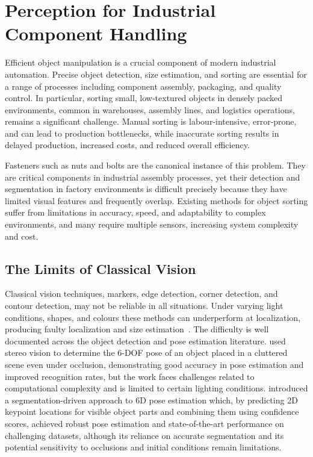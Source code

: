 \section{Perception for Industrial Component Handling}\label{sec:intro_perception}

Efficient object manipulation is a crucial component of modern industrial automation. Precise
object detection, size estimation, and sorting are essential for a range of processes including
component assembly, packaging, and quality control. In particular, sorting small, low-textured
objects in densely packed environments, common in warehouses, assembly lines, and logistics
operations, remains a significant challenge. Manual sorting is labour-intensive, error-prone,
and can lead to production bottlenecks, while inaccurate sorting results in delayed production,
increased costs, and reduced overall efficiency.

Fasteners such as nuts and bolts are the canonical instance of this problem. They are critical
components in industrial assembly processes, yet their detection and segmentation in factory
environments is difficult precisely because they have limited visual features and frequently
overlap. Existing methods for object sorting suffer from limitations in accuracy, speed, and
adaptability to complex environments, and many require multiple sensors, increasing system
complexity and cost.

\subsection{The Limits of Classical Vision}\label{subsec:intro_classical}

Classical vision techniques, markers, edge detection, corner detection, and contour detection,
may not be reliable in all situations. Under varying light conditions, shapes, and colours
these methods can underperform at localization, producing faulty localization and size
estimation~\citep{omahony2020deep}. The difficulty is well documented across the object detection and pose estimation literature. \citet{sumi2002object} used stereo vision to determine the 6-DOF pose of an object placed in a cluttered scene even under occlusion, demonstrating good accuracy in pose estimation and improved recognition rates, but the work faces challenges related to computational complexity and is limited to certain lighting conditions. \citet{hu2018segmentation} introduced a segmentation-driven approach to 6D pose estimation which, by predicting 2D keypoint locations for visible object parts and combining them using confidence scores, achieved robust pose estimation and state-of-the-art performance on challenging datasets, although its reliance on accurate segmentation and its potential sensitivity to occlusions and initial conditions remain
limitations.

